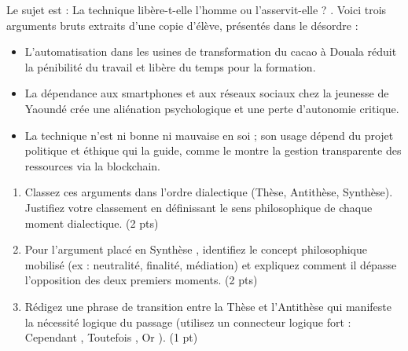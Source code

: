 \documentclass[11pt]{article}
\begin{document}
\begin{exercice}
Le sujet est : \og La technique libère-t-elle l'homme ou l'asservit-elle ? \fg{}. Voici trois arguments bruts extraits d'une copie d'élève, présentés dans le désordre :
\begin{itemize}
    \item[A.] \og L'automatisation dans les usines de transformation du cacao à Douala réduit la pénibilité du travail et libère du temps pour la formation. \fg{}
    \item[B.] \og La dépendance aux smartphones et aux réseaux sociaux chez la jeunesse de Yaoundé crée une aliénation psychologique et une perte d'autonomie critique. \fg{}
    \item[C.] \og La technique n'est ni bonne ni mauvaise en soi ; son usage dépend du projet politique et éthique qui la guide, comme le montre la gestion transparente des ressources via la blockchain. \fg{}
\end{itemize}
\begin{enumerate}
    \item Classez ces arguments dans l'ordre dialectique (Thèse, Antithèse, Synthèse). Justifiez votre classement en définissant le sens philosophique de chaque moment dialectique. (2 pts)
    \item Pour l'argument placé en \og Synthèse \fg{}, identifiez le concept philosophique mobilisé (ex : neutralité, finalité, médiation) et expliquez comment il dépasse l'opposition des deux premiers moments. (2 pts)
    \item Rédigez une phrase de transition entre la Thèse et l'Antithèse qui manifeste la nécessité logique du passage (utilisez un connecteur logique fort : \og Cependant \fg{}, \og Toutefois \fg{}, \og Or \fg{}). (1 pt)
\end{enumerate}
\end{exercice}
\end{document}
